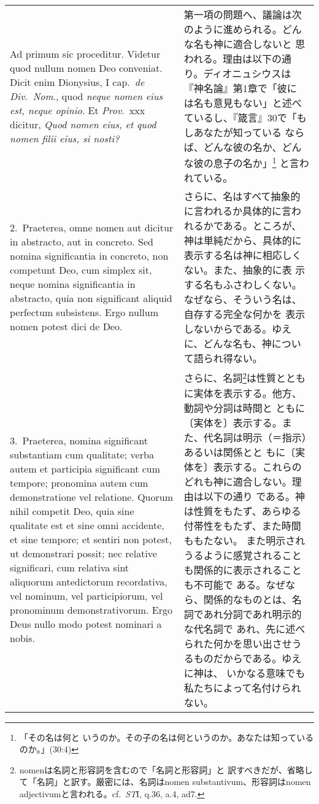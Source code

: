 \documentclass[10pt]{jsarticle}
\begin{document}
\begin{longtable}{p{21em}p{21em}}

{\sc Ad primum sic proceditur}. Videtur quod nullum nomen Deo
conveniat. Dicit enim Dionysius, I cap.\ {\it de Div.\ Nom}., quod
{\it neque nomen eius est, neque opinio}. Et {\it Prov}.\ {\sc xxx}
dicitur, {\it Quod nomen eius, et quod nomen filii eius, si nosti?}

&

第一項の問題へ、議論は次のように進められる。どんな名も神に適合しないと
思われる。理由は以下の通り。ディオニュシウスは『神名論』第1章で「彼に
は名も意見もない」と述べているし、『箴言』30で「もしあなたが知っている
ならば、どんな彼の名か、どんな彼の息子の名か」\footnote{「その名は何と
いうのか。その子の名は何というのか。あなたは知っているのか。」(30:4)}
と言われている。

\\

2.~{\sc Praeterea}, omne nomen aut dicitur in abstracto, aut in
concreto. Sed nomina significantia in concreto, non competunt Deo, cum
simplex sit, neque nomina significantia in abstracto, quia non
significant aliquid perfectum subsistens. Ergo nullum nomen potest
dici de Deo.

&

さらに、名はすべて抽象的に言われるか具体的に言われるかである。ところが、
神は単純だから、具体的に表示する名は神に相応しくない。また、抽象的に表
示する名もふさわしくない。なぜなら、そういう名は、自存する完全な何かを
表示しないからである。ゆえに、どんな名も、神について語られ得ない。

\\

3.~{\sc Praeterea}, nomina significant substantiam cum qualitate;
verba autem et participia significant cum tempore; pronomina autem cum
demonstratione vel relatione. Quorum nihil competit Deo, quia sine
qualitate est et sine omni accidente, et sine tempore; et sentiri non
potest, ut demonstrari possit; nec relative significari, cum relativa
sint aliquorum antedictorum recordativa, vel nominum, vel
participiorum, vel pronominum demonstrativorum. Ergo Deus nullo modo
potest nominari a nobis.

&

さらに、名詞\footnote{nomenは名詞と形容詞を含むので「名詞と形容詞」と
訳すべきだが、省略して「名詞」と訳す。厳密には、名詞はnomen
substantivum、形容詞はnomen adjectivumと言われる。cf.~{\itshape ST}I,
q.36, a.4, ad7.}は性質とともに実体を表示する。他方、動詞や分詞は時間と
ともに〔実体を〕表示する。また、代名詞は明示（＝指示）あるいは関係とと
もに〔実体を〕表示する。これらのどれも神に適合しない。理由は以下の通り
である。神は性質をもたず、あらゆる付帯性をもたず、また時間ももたない。
また明示されうるように感覚されることも関係的に表示されることも不可能で
ある。なぜなら、関係的なものとは、名詞であれ分詞であれ明示的な代名詞で
あれ、先に述べられた何かを思い出させうるものだからである。ゆえに神は、
いかなる意味でも私たちによって名付けられない。


\end{longtable}
\end{document}

